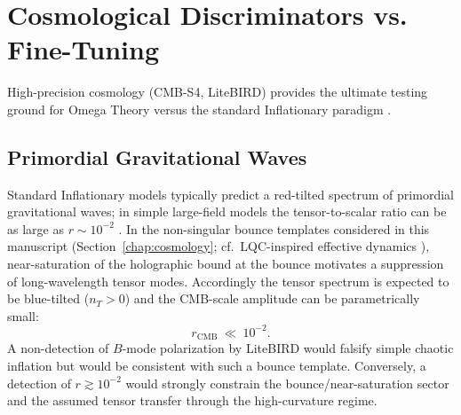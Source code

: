 \section{Cosmological Discriminators vs. Fine-Tuning}
\label{chap:discriminators}

High-precision cosmology (CMB-S4, LiteBIRD) provides the ultimate testing ground for Omega Theory versus the standard Inflationary paradigm \cite{Planck2018CosmoParams,LiddleLyth2000,Baumann2009TASI}.

\subsection{Primordial Gravitational Waves}
Standard Inflationary models typically predict a red-tilted spectrum of primordial gravitational waves; in simple large-field models the tensor-to-scalar ratio can be as large as $r\sim 10^{-2}$ \cite{LiddleLyth2000,Baumann2009TASI}.
In the non-singular bounce templates considered in this manuscript (Section~\ref{chap:cosmology}; cf.\ LQC-inspired effective dynamics \cite{AshtekarPawlowskiSingh2006}), near-saturation of the holographic bound at the bounce motivates a suppression of long-wavelength tensor modes. Accordingly the tensor spectrum is expected to be blue-tilted ($n_T>0$) and the CMB-scale amplitude can be parametrically small:
\begin{equation}
    r_{\mathrm{CMB}}\ \ll\ 10^{-2}.
\end{equation}
A non-detection of $B$-mode polarization by LiteBIRD would falsify simple chaotic inflation but would be consistent with such a bounce template. Conversely, a detection of $r \gtrsim 10^{-2}$ would strongly constrain the bounce/near-saturation sector and the assumed tensor transfer through the high-curvature regime.

